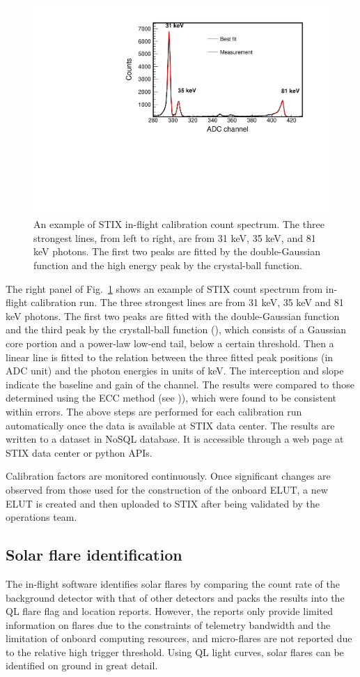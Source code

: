\documentclass{aa}
\begin{document}
\begin{figure}
 \centering
  \includegraphics[width=0.8\linewidth]{figures/cal-fit.pdf}
  \caption{An example of STIX in-flight calibration count spectrum.
  The three strongest lines, from left to right, are from 31 keV, 35 keV, and 81 keV
  photons. The first two peaks are fitted by the double-Gaussian function and the high energy peak by  
  the crystal-ball function. }
    \label{fig:cal-fit}
\end{figure}
The right panel of Fig.~\ref{fig:cal-fit} shows 
an example of STIX count spectrum from in-flight calibration run.  
The three strongest lines are from 31 keV, 35 keV and 81 keV photons. 
The first two peaks are fitted with the double-Gaussian function and the third peak
by the crystall-ball function (\cite{crsystallball}),  which consists of a Gaussian core portion 
and a power-law low-end tail, below a certain threshold.
Then a linear line is fitted to the relation between
the three fitted peak positions (in ADC unit) and the photon energies in units of keV.  
The interception and slope indicate the baseline and gain of the channel. 
The results were compared to those determined using the ECC method (see \cite{ecc,ecc2})), 
 which were found to be consistent within errors.
The above steps are performed for each calibration run automatically 
once the data is available at STIX data center.  The results are written to a
 dataset in  NoSQL database.  It is accessible through a web page at STIX data center or python APIs.

Calibration factors are monitored continuously. Once significant changes are 
observed from those used for the construction of  the onboard ELUT, 
 a new ELUT is  created and  then uploaded to STIX after being validated by the operations team. 

\subsection{Solar flare identification}
The in-flight software identifies solar flares by comparing  the count rate of 
the background detector with that of other detectors 
 and packs the results into the QL flare flag and location reports.
However,  the reports only provide limited information on flares due to the constraints of telemetry 
bandwidth and the limitation of onboard computing resources, and micro-flares are not 
reported due to the relative high trigger threshold.
Using QL light curves, solar flares can be identified on ground in great detail.
\end{document}
